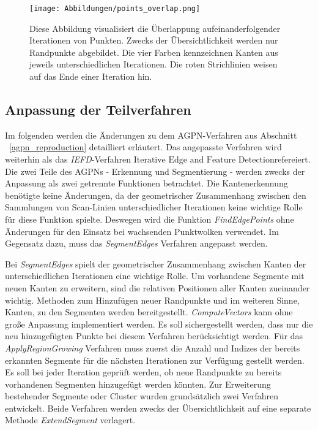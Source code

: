 \begin{figure}[h]
	\texttt{[image: Abbildungen/points\_overlap.png]}
	\centering
	\caption{Diese Abbildung visualisiert die Überlappung aufeinanderfolgender Iterationen von Punkten. Zwecks der Übersichtlichkeit werden nur Randpunkte abgebildet. Die vier Farben kennzeichnen Kanten aus jeweils unterschiedlichen Iterationen. Die roten Strichlinien weisen auf das Ende einer Iteration hin.}
	\label{fig: point_overlap}
\end{figure}

\subsection{Anpassung der Teilverfahren}
Im folgenden werden die Änderungen zu dem AGPN-Verfahren aus Abschnitt ~\ref{agpn_reproduction} detailliert erläutert. Das angepasste Verfahren wird weiterhin als das \textit{IEFD}-Verfahren \textit{\(\text{Iterative Edge and Feature Detection}\)}refereiert. Die zwei Teile des AGPNs - Erkennung und Segmentierung - werden zwecks der Anpassung als zwei getrennte Funktionen betrachtet. Die Kantenerkennung benötigte keine Änderungen, da der geometrischer Zusammenhang zwischen den Sammlungen von Scan-Linien unterschiedlicher Iterationen keine wichtige Rolle für diese Funktion spielte. Deswegen wird die Funktion \textit{FindEdgePoints} ohne Änderungen für den Einsatz bei wachsenden Punktwolken verwendet. Im Gegensatz dazu, muss das \textit{SegmentEdges} Verfahren angepasst werden.

Bei \textit{SegmentEdges} spielt der geometrischer Zusammenhang zwischen Kanten der unterschiedlichen Iterationen eine wichtige Rolle. Um vorhandene Segmente mit neuen Kanten zu erweitern, sind die relativen Positionen aller Kanten zueinander wichtig. Methoden zum Hinzufügen neuer Randpunkte und im weiteren Sinne, Kanten, zu den Segmenten werden bereitgestellt. \textit{ComputeVectors} kann ohne große Anpassung implementiert werden. Es soll sichergestellt werden, dass nur die neu hinzugefügten Punkte bei diesem Verfahren berücksichtigt werden. Für das \textit{ApplyRegionGrowing} Verfahren muss zuerst die Anzahl und Indizes der bereits erkannten Segmente für die nächsten Iterationen zur Verfügung gestellt werden. Es soll bei jeder Iteration geprüft werden, ob neue Randpunkte zu bereits vorhandenen Segmenten hinzugefügt werden könnten. Zur Erweiterung bestehender Segmente oder Cluster wurden grundsätzlich zwei Verfahren entwickelt. Beide Verfahren werden zwecks der Übersichtlichkeit auf eine separate Methode \textit{ExtendSegment} verlagert.


